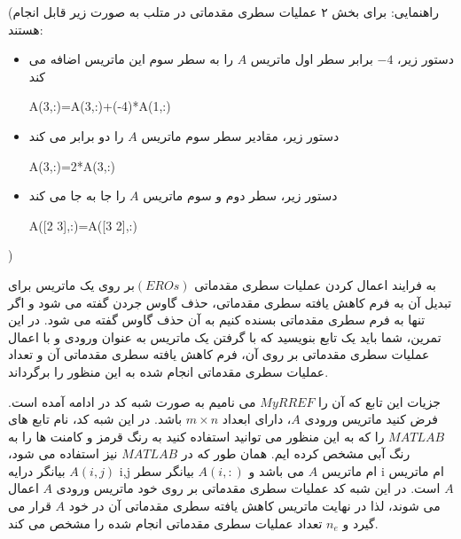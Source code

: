 \documentclass{article}
\begin{document}
(راهنمایی:
 برای بخش ۲ عملیات سطری مقدماتی در متلب به صورت زیر قابل انجام هستند:
 \begin{itemize}
 	\item 
 	دستور زیر، $-4$ برابر سطر اول ماتریس $A$ را به سطر سوم این ماتریس اضافه می کند
 	\begin{latin}
 		A(3,:)=A(3,:)+(-4)*A(1,:)
 	\end{latin}
  	\item 
 دستور زیر، مقادیر سطر سوم ماتریس $A$ را دو برابر می کند
 \begin{latin}
 	A(3,:)=2*A(3,:)
 \end{latin}
 	\item 
دستور زیر، سطر دوم و سوم ماتریس $A$ را جا به جا می کند
\begin{latin}
	A([2 3],:)=A([3 2],:)
\end{latin}
\end{itemize}
	
)


\clearpage
{}

به فرایند اعمال کردن عملیات سطری مقدماتی $(EROs) $بر روی یک ماتریس برای تبدیل آن به فرم کاهش یافته سطری مقدماتی، حذف گاوس جردن گفته می شود و اگر تنها به فرم سطری مقدماتی بسنده کنیم به آن حذف گاوس گفته می شود.
در این تمرین، شما باید یک تابع بنویسید که با گرفتن یک ماتریس به عنوان ورودی و با اعمال عملیات سطری مقدماتی بر روی آن، فرم کاهش یافته سطری مقدماتی آن و تعداد عملیات سطری مقدماتی انجام شده به این منظور را برگرداند.

جزیات این تابع که آن را $ MyRREF$ می نامیم به صورت شبه کد در ادامه آمده است. فرض کنید ماتریس ورودی $A$، دارای ابعداد $m \times n$ باشد.
در این شبه کد، نام تابع های $MATLAB$ را که به این منظور می توانید استفاده کنید به رنگ قرمز و کامنت ها را به رنگ آبی مشخص کرده ایم.
همان طور که در $MATLAB$  نیز استفاده می شود،  
$A(i,j)$
  بیانگر درایه i,j ام ماتریس $A$ می باشد و 
$A(i,:)$
    بیانگر سطر i ام ماتریس $A$ است. در این شبه کد عملیات سطری مقدماتی بر روی خود ماتریس ورودی  $A$ اعمال می شوند، لذا در نهایت ماتریس کاهش یافته سطری مقدماتی آن در خود $A$ قرار می گیرد و $n_e$ تعداد عملیات سطری مقدماتی انجام شده را مشخص می کند.
\end{document}
